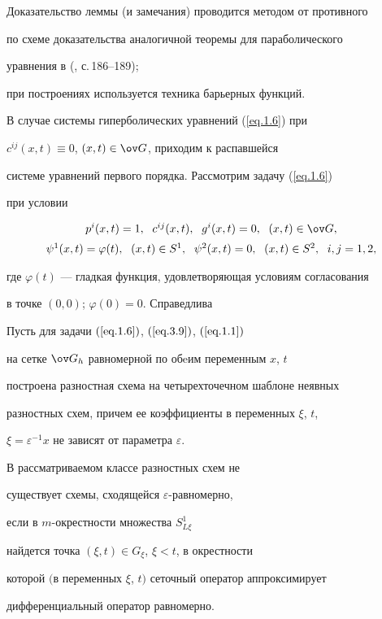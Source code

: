 Доказательство леммы (и замечания) проводится методом от противного


по схеме доказательства аналогичной теоремы для параболического


уравнения в (\cite{6}, с.\,186--189);


при построениях используется техника барьерных функций.





В случае системы гиперболических уравнений (\ref{eq.1.6}) при


$c^{ij}(x, t)\equiv 0$, $(x, t)\in \ov G$, приходим к распавшейся


системе уравнений первого порядка. Рассмотрим задачу (\ref{eq.1.6})


при условии


\begin{equation}


\label{eq.3.9}


\begin{array}{c}


p^i(x, t)=1, \ \; c^{ij}(x, t), \ \; g^i(x, t)=0, \ \; (x, t)\in


\ov G,\\[2mm]


\psi^1(x, t)=\varphi(t), \ \; (x, t)\in S^1, \ \; \psi^2(x, t)=0, \ \; (x,


t)\in S^2, \ \; i,j=1,2,


\end{array}


\end{equation}


где $\varphi(t)$ --- гладкая функция, удовлетворяющая условиям согласования


в точке $(0, 0)$; $\varphi(0)=0$. Справедлива





\begin{thms} \label{t3.1}


Пусть для задачи $(\ref{eq.1.6})$, $(\ref{eq.3.9})$, $(\ref{eq.1.1})$


на сетке $\ov G_h$ равномерной по обeим переменным $x$, $t$


построена разностная схема на четырехточечном шаблоне неявных


разностных схем, причем ее коэффициенты в переменных $\xi$, $t$,


$\xi=\varepsilon^{-1} x$ не зависят от параметра $\varepsilon$.


В рассматриваемом классе разностных схем не


существует схемы, сходящейся $\varepsilon$-равномерно,


если в $m$-окрестности множества $S^1_{L\xi}$


найдется точка $(\xi,t)\in G_\xi$, $\xi<t$, в окрестности


которой $($в переменных $\xi$, $t)$ сеточный оператор аппроксимирует


дифференциальный оператор равномерно.


\end{thms}





